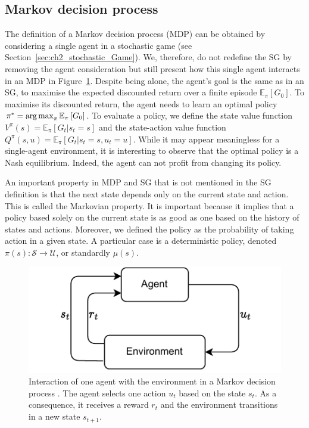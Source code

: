 \subsection{Markov decision process}
\label{sec:ch2_mdp}

The definition of a Markov decision process (MDP) can be obtained by considering a single agent in a stochastic game (see Section~\ref{sec:ch2_stochastic_Game}).
We, therefore, do not redefine the SG by removing the agent consideration but still present how this single agent interacts in an MDP in Figure~\ref{fig:ch2_mdp}.
Despite being alone, the agent's goal is the same as in an SG, to maximise the expected discounted return over a finite episode $\mathbb{E}_{\pi}\left[ G_0 \right]$.
To maximise its discounted return, the agent needs to learn an optimal policy $\pi^* = \operatorname*{arg\,max}_\pi \mathbb{E}_{\pi}\left[ G_0 \right]$.
To evaluate a policy, we define the state value function $V^\pi(s) = \mathbb{E}_{\pi}\left[G_t|s_t=s\right]$ and the state-action value function $Q^\pi(s, u) = \mathbb{E}_{\pi}\left[G_t|s_t=s, u_t=u\right]$.
While it may appear meaningless for a single-agent environment, it is interesting to observe that the optimal policy is a Nash equilibrium.
Indeed, the agent can not profit from changing its policy.

An important property in MDP and SG that is not mentioned in the SG definition is that the next state depends only on the current state and action.
This is called the Markovian property.
It is important because it implies that a policy based solely on the current state is as good as one based on the history of states and actions.
Moreover, we defined the policy as the probability of taking action in a given state.
A particular case is a deterministic policy, denoted $\pi(s):\mathcal{S}\rightarrow\mathcal{U}$, or standardly $\mu(s)$.


\begin{figure}
    \centering
    \includegraphics[width=.8\linewidth]{tex_thesis/figures/ch2/MDP.pdf}
    \caption{Interaction of one agent with the environment in a Markov decision process \citep{sutton2018reinforcement}. The agent selects one action $u_t$ based on the state $s_t$. As a consequence, it receives a reward $r_t$ and the environment transitions in a new state $s_{t+1}$.}
    \label{fig:ch2_mdp}
\end{figure}

